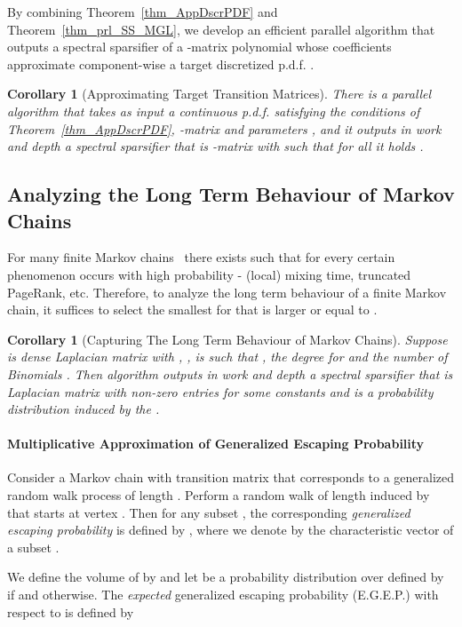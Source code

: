 \documentclass[11pt]{article}
\newtheorem{cor}[thm]{Corollary}
\numberwithin{thm}{section}
\begin{document}
By combining Theorem~\ref{thm_AppDscrPDF} and Theorem~\ref{thm_prl_SS_MGL}, we develop an efficient parallel algorithm that outputs a spectral sparsifier of a -matrix polynomial whose coefficients approximate component-wise a target discretized p.d.f. .

\begin{cor}[Approximating Target Transition Matrices]
There is a parallel algorithm that takes as input a continuous p.d.f.  satisfying the conditions of Theorem~\ref{thm_AppDscrPDF}, -matrix  and parameters , and it outputs in  work and  depth a spectral sparsifier  that is -matrix with  such that for all  it holds
.
\end{cor}


\subsection{Analyzing the Long Term Behaviour of Markov Chains}\label{subsec:Apps}

For many finite Markov chains~\cite{SJ89,ACL06,OT12,KS14} there exists  such that for every  certain phenomenon occurs with high probability - (local) mixing time, truncated PageRank, etc. Therefore, to analyze the long term behaviour of a finite Markov chain, it suffices to select the smallest  for  that is larger or equal to .

\begin{cor}[Capturing The Long Term Behaviour of Markov Chains]\label{cor:denseTmtx}
Suppose  is dense Laplacian matrix with , ,  is  such that , the degree  for  and the number of Binomials . Then algorithm  outputs in work  and depth  a spectral sparsifier  that is Laplacian matrix with  non-zero entries for some constants  and  is a probability distribution induced by the  .
\end{cor}


\paragraph*{Multiplicative Approximation of Generalized Escaping Probability}

Consider a Markov chain with transition matrix  that corresponds to a generalized random walk process of length . Perform a random walk of length  induced by  that starts at vertex . Then for any subset , the corresponding \emph{generalized escaping probability} is defined by , where we denote by  the characteristic vector of a subset .

We define the volume of  by  and let  be a probability distribution over  defined by  if  and  otherwise. The \emph{expected} generalized escaping probability (E.G.E.P.) with respect to  is defined by
\end{document}
